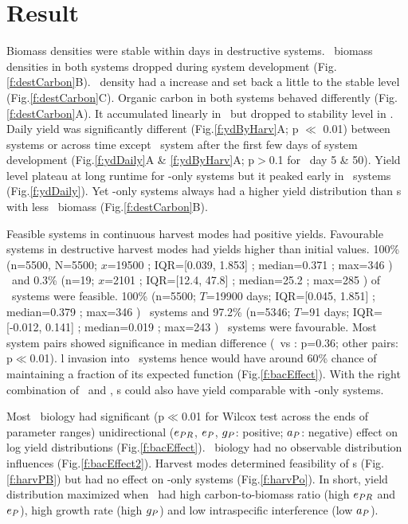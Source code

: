\documentclass[../thesis.tex]{subfiles} %
\begin{document}
\section{Result}
Biomass densities were stable within days in destructive systems.  \Phy\ biomass densities in both systems dropped during system development (Fig.\ref{f:destCarbon}B).  \Bac\ density had a increase and set back a little to the stable level (Fig.\ref{f:destCarbon}C).  Organic carbon in both systems behaved differently (Fig.\ref{f:destCarbon}A).  It accumulated linearly in \PoN\ but dropped to stability level in \PBN.  Daily yield was significantly different (Fig.\ref{f:ydByHarv}A; p $\ll$ 0.01) between systems or across time except \PoN\ system after the first few days of system development (Fig.\ref{f:ydDaily}A \& \ref{f:ydByHarv}A; p$>$0.1 for \PoN\ day 5 \& 50).  Yield level plateau at long runtime for \phy-only systems but it peaked early in \PBN\ systems (Fig.\ref{f:ydDaily}).  Yet \phy-only systems always had a higher yield distribution than \pbs s with less \phy\ biomass (Fig.\ref{f:destCarbon}B).

Feasible systems in continuous harvest modes had positive yields.  Favourable systems in destructive harvest modes had yields higher than initial values.  100\% (n=5500, N=5500; $x$=19500 \dayU; IQR=[0.039, 1.853] \dxdt; median=0.371 \dxdt; max=346 \dxdt) \PoH\ and 0.3\% (n=19; $x$=2101 \dayU; IQR=[12.4, 47.8] \dxdt; median=25.2 \dxdt; max=285 \dxdt) of \PBH\ systems were feasible.  100\% (n=5500; $T$=19900 days; IQR=[0.045, 1.851] \dxdt; median=0.379 \dxdt; max=346 \dxdt) \PoN\ systems and 97.2\% (n=5346; $T$=91 days; IQR=[-0.012, 0.141] \dxdt; median=0.019 \dxdt; max=243 \dxdt) \PBN\ systems were favourable.  Most system pairs showed significance in median difference (\PoH\ vs \PoN: p=0.36; other pairs: p$\ll$0.01).  \Bac l invasion into \PoN\ systems hence would have around 60\% chance of maintaining a fraction of its expected function (Fig.\ref{f:bacEffect}).  With the right combination of \phy\ and \bac, \pbs s could also have yield comparable with \phy-only systems.

Most \phy\ biology had significant (p$\ll$0.01 for Wilcox test across the ends of parameter ranges) unidirectional ($e_{PR}$, $e_P$, $g_P$: positive; $a_P$: negative) effect on log yield distributions (Fig.\ref{f:bacEffect}).  \Bac\ biology had no observable distribution influences (Fig.\ref{f:bacEffect2}).  Harvest modes determined feasibility of \pbs s (Fig.\ref{f:harvPB}) but had no effect on \phy-only systems (Fig.\ref{f:harvPo}).  In short, yield distribution maximized when \phy\ had high carbon-to-biomass ratio (high $e_{PR}$ and $e_P$), high growth rate (high $g_P$) and low intraspecific interference (low $a_P$).
\end{document}
